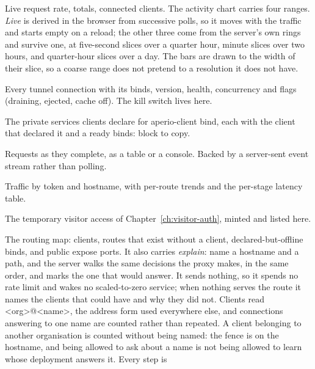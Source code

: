 \documentclass[11pt,a4paper,oneside]{book}
\newcommand{\aperiobreakableunderscore}{\textunderscore\allowbreak}
\newcommand{\aperiocodebreaks}{\XeTeXinterchartokenstate=1 }
\newcommand{\aperiocodebreaks}{}
\DeclareRobustCommand{\code}[1]{{\ttfamily\small\aperiocodebreaks
  \let\_\aperiobreakableunderscore#1}}
\begin{document}
\begin{description}[leftmargin=1.6em,style=nextline]
  \item[Overview] Live request rate, totals, connected clients. The
        activity chart carries four ranges. \emph{Live} is derived in the
        browser from successive polls, so it moves with the traffic and
        starts empty on a reload; the other three come from the server's
        own rings and survive one, at five-second slices over a quarter
        hour, minute slices over two hours, and quarter-hour slices over a
        day. The bars are drawn to the width of their slice, so a coarse
        range does not pretend to a resolution it does not have.
  \item[Clients] Every tunnel connection with its binds, version, health,
        concurrency and flags (draining, ejected, cache off). The kill
        switch lives here.
  \item[Tunnels] The private services clients declare for
        \code{aperio-client bind}, each with the client that declared it
        and a ready \code{binds:} block to copy.
  \item[Live Traffic] Requests as they complete, as a table or a console.
        Backed by a server-sent event stream rather than polling.
  \item[Breakdown] Traffic by token and hostname, with per-route trends
        and the per-stage latency table.
  \item[Share Links] The temporary visitor access of
        Chapter~\ref{ch:visitor-auth}, minted and listed here.
  \item[Topology] The routing map: clients, routes that exist without a
        client, declared-but-offline binds, and public expose ports.
        It also carries \emph{explain}: name a hostname and a path, and
        the server walks the same decisions the proxy makes, in the same
        order, and marks the one that would answer. It sends nothing, so
        it spends no rate limit and wakes no scaled-to-zero service; when
        nothing serves the route it names the clients that could have and
        why they did not. Clients read \code{<org>@<name>}, the address
        form used everywhere else, and connections answering to one name
        are counted rather than repeated. A client belonging to another
        organisation is counted without being named: the fence is on the
        hostname, and being allowed to ask about a name is not being
        allowed to learn whose deployment answers it. Every step is

\end{description}
\end{document}
